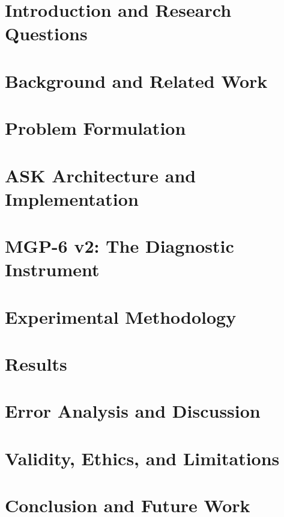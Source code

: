 \documentclass[twoside,msc,irfonts]{./tex/tehran-thesis}
\begin{document}

\pagestyle{fancy}
\fancyhf{}
\fancyfoot[C]{\thepage}

\begin{latin}
\chapter{Introduction and Research Questions}

\chapter{Background and Related Work}

\chapter{Problem Formulation}

\chapter{ASK Architecture and Implementation}

\chapter{MGP-6 v2: The Diagnostic Instrument}

\chapter{Experimental Methodology}

\chapter{Results}

\chapter{Error Analysis and Discussion}

\chapter{Validity, Ethics, and Limitations}

\chapter{Conclusion and Future Work}

\end{latin}
\end{document}

